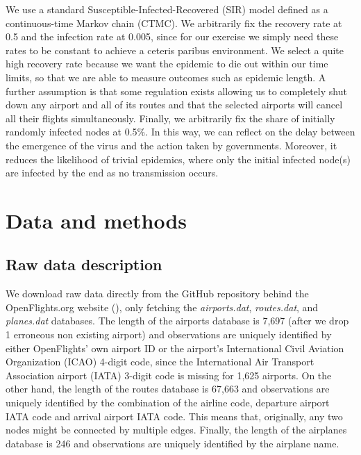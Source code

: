 \documentclass{Template_resources/netsci-project}
\begin{document}
We use a standard Susceptible-Infected-Recovered (SIR) model defined as a continuous-time Markov chain (CTMC). We arbitrarily fix the recovery rate at 0.5 and the infection rate at 0.005, since for our exercise we simply need these rates to be constant to achieve a ceteris paribus environment. We select a quite high recovery rate because we want the epidemic to die out within our time limits, so that we are able to measure outcomes such as epidemic length. A further assumption is that some regulation exists allowing us to completely shut down any airport and all of its routes and that the selected airports will cancel all their flights simultaneously. 
Finally, we arbitrarily fix the share of initially randomly infected nodes at 0.5\%. In this way, we can reflect on the delay between the emergence of the virus and the action taken by governments. Moreover, it reduces the likelihood of trivial epidemics, where only the initial infected node(s) are infected by the end as no transmission occurs.


\section{Data and methods}
\subsection{Raw data description}
We download raw data directly from the GitHub repository behind the OpenFlights.org website (\cite{OpenFlights2008}), only fetching the \textit{airports.dat}, \textit{routes.dat}, and \textit{planes.dat} databases. The length of the airports database is 7,697 (after we drop 1 erroneous non existing airport) and observations are uniquely identified by either OpenFlights' own airport ID or the airport's International Civil Aviation Organization (ICAO) 4-digit code, since the International Air Transport Association airport (IATA) 3-digit code is missing for 1,625 airports. On the other hand, the length of the routes database is 67,663 and observations are uniquely identified by the combination of the airline code, departure airport IATA code and arrival airport IATA code. This means that, originally, any two nodes might be connected by multiple edges. Finally, the length of the airplanes database is 246 and observations are uniquely identified by the airplane name.
\end{document}
